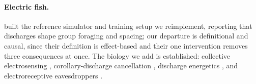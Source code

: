 \documentclass[10pt,twoside]{article}
\begin{document}
\paragraph{Electric fish.} \citet{singh2025active} built the reference simulator
and training setup we reimplement, reporting that discharges shape group foraging
and spacing; our departure is definitional and causal, since their definition is
effect-based and their one intervention removes three consequences at once. The
biology we add is established: collective electrosensing
\citep{pedraja2024collective}, corollary-discharge cancellation
\citep{wallach2023internal}, discharge energetics
\citep{salazar2013energetics,markham2009circadian}, and electroreceptive
eavesdroppers \citep{stoddard1999predation,hanika1999electric}.







\small


\normalsize


\end{document}
